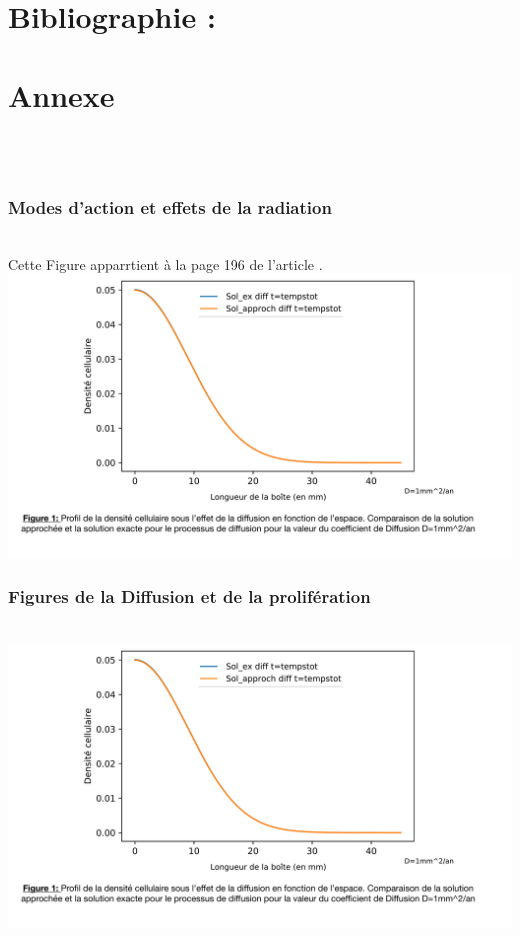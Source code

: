 \documentclass[12pt,a4paper]{article}
\begin{document}
\section{Bibliographie :}



	


\vspace{13cm}
\def\theequation{\Roman{equation}}
\section{Annexe}
\\
\\
\subsubsection{Modes d'action et effets de la radiation}
\\
Cette Figure apparrtient à la page 196 de l'article \cite{h} .
\\
\includegraphics[page=6,scale=0.26]{FIGURES.pdf}
\\
\subsubsection{Figures de la Diffusion et de la prolifération}
\\
\includegraphics[page=7,scale=0.25]{FIGURES.pdf}
\\
\end{document}
